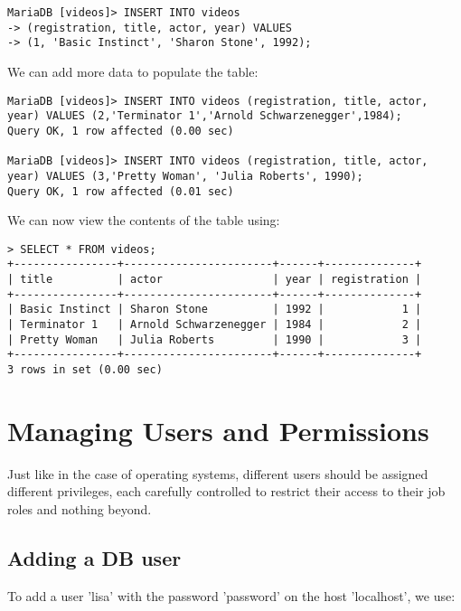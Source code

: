 \vspace{-15pt}
\begin{verbatim}
MariaDB [videos]> INSERT INTO videos
-> (registration, title, actor, year) VALUES
-> (1, 'Basic Instinct', 'Sharon Stone', 1992);
\end{verbatim}
\vspace{-10pt}	

\noindent
We can add more data to populate the table:

\vspace{-15pt}
\begin{verbatim}
MariaDB [videos]> INSERT INTO videos (registration, title, actor, year) VALUES (2,'Terminator 1','Arnold Schwarzenegger',1984);
Query OK, 1 row affected (0.00 sec)

MariaDB [videos]> INSERT INTO videos (registration, title, actor, year) VALUES (3,'Pretty Woman', 'Julia Roberts', 1990);
Query OK, 1 row affected (0.01 sec)
\end{verbatim}
\vspace{-10pt}	

\noindent
We can now view the contents of the table using:

\vspace{-15pt}
\begin{verbatim}
> SELECT * FROM videos;
+----------------+-----------------------+------+--------------+
| title          | actor                 | year | registration |
+----------------+-----------------------+------+--------------+
| Basic Instinct | Sharon Stone          | 1992 |            1 |
| Terminator 1   | Arnold Schwarzenegger | 1984 |            2 |
| Pretty Woman   | Julia Roberts         | 1990 |            3 |
+----------------+-----------------------+------+--------------+
3 rows in set (0.00 sec)
\end{verbatim}
\vspace{-10pt}	

\section{Managing Users and Permissions}
Just like in the case of operating systems, different users should be assigned different privileges, each carefully controlled to restrict their access to their job roles and nothing beyond. 

\subsection{Adding a DB user}
To add a user 'lisa' with the password 'password' on the host 'localhost', we use:

